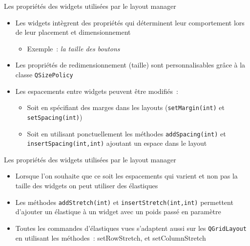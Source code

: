 \documentclass{beamer} %
\begin{document}
\begin{frame}
	\begin{block}{Les propriétés des widgets utilisées par le layout manager}
	\begin{itemize}
	\item Les widgets intègrent des propriétés qui déterminent leur comportement lors de leur placement et dimensionnement
		\begin{itemize}
		\item<2-> Exemple~: \textit{la taille des boutons}\newline
		\hspace*{2cm}
		\end{itemize}
	\item<3-> Les propriétés de redimensionnement (taille) sont personnalisables grâce à la classe \texttt{QSizePolicy}
	\item<4-> Les espacements entre widgets peuvent être modifiés~:
		\begin{itemize}
		\item<5-> Soit en spécifiant des marges dans les layouts (\texttt{setMargin(int)} et \texttt{setSpacing(int)})
		\item<6-> Soit en utilisant ponctuellement les méthodes \texttt{addSpacing(int)} et \texttt{insertSpacing(int,int)} ajoutant un espace dans le layout
		\end{itemize}
	\end{itemize}
	\end{block}
\end{frame}

\begin{frame}
	\begin{block}{Les propriétés des widgets utilisées par le layout manager}
	\begin{itemize}
	\item Lorsque l'on souhaite que ce soit les espacements qui varient et non pas la taille des widgets on peut utiliser des élastiques
	\item<2-> Les méthodes \texttt{addStretch(int)} et \texttt{insertStretch(int,int)}  permettent d'ajouter un élastique à un widget avec un poids passé en paramètre
	\item<3-> Toutes les commandes d'élastiques vues s'adaptent aussi sur les \texttt{QGridLayout} en utilisant les méthodes~: {\ttfamily setRowStretch, \textrm{et} setColumnStretch}
	\end{itemize}
	
	\end{block}
\end{frame}
\end{document}
